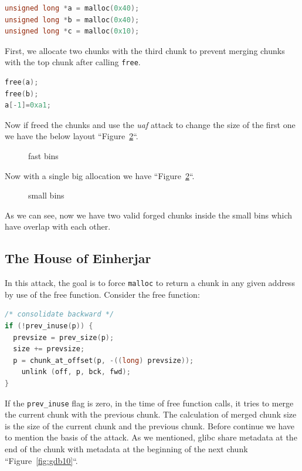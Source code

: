 \documentclass{masterthesis}
\newcommand*\libc{glibc}
\newcommand*\fb{fast bins}
\newcommand*\sbs{small bins}
\newcommand*\mallocc{\lstinline{malloc}\xspace}
\newcommand*\freec{\lstinline{free}\xspace}
\begin{document}
\begin{lstlisting}[language=c,frame=tlrb]
unsigned long *a = malloc(0x40);
unsigned long *b = malloc(0x40);
unsigned long *c = malloc(0x10);
\end{lstlisting}

First, we allocate two chunks with the third chunk to prevent merging chunks with the top chunk after calling \freec{}.

\begin{lstlisting}[language=c,frame=tlrb]
free(a);
free(b);
a[-1]=0xa1;
\end{lstlisting}

Now if freed the chunks and use the \emph{uaf} attack to change the size of the first one we have the below layout ``Figure~\ref{fig:gdb9}``.

\begin{figure}[h!]
 \caption{\fb{}}
  \label{fig:gdb8}
\end{figure}

Now with a single big allocation we have ``Figure~\ref{fig:gdb9}``.
\begin{figure}[h!]
 \caption{\sbs{}}
  \label{fig:gdb9}
\end{figure}

As we can see, now we have two valid forged chunks inside the \sbs{} which have overlap with each other.

\subsection{The House of Einherjar}
\label{subsect:houseein}
In this attack, the goal is to force \mallocc{} to return a chunk in any given address by use of the free function. Consider the free function:

\begin{lstlisting}[language=c,frame=tlrb]
/* consolidate backward */
if (!prev_inuse(p)) {
  prevsize = prev_size(p);
  size += prevsize;
  p = chunk_at_offset(p, -((long) prevsize));
	unlink (off, p, bck, fwd);
}
 \end{lstlisting}
If the \lstinline{prev_inuse} flag is zero, in the time of free function calls, it tries to merge the current chunk with the previous chunk. The calculation of merged chunk size is the size of the current chunk and the previous chunk. Before continue we have to mention the basis of the attack. As we mentioned, \libc{} share metadata at the end of the chunk with metadata at the beginning of the next chunk ``Figure~\ref{fig:gdb10}``.
\end{document}
